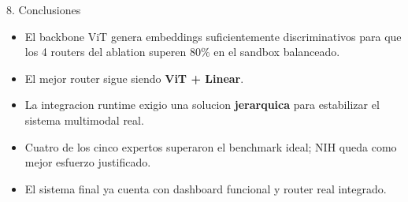 \documentclass[aspectratio=169,11pt]{beamer}
\begin{document}
\begin{frame}{8. Conclusiones}
\begin{itemize}
  \item El backbone ViT genera embeddings suficientemente discriminativos para que los 4 routers del ablation superen 80\% en el sandbox balanceado.
  \item El mejor router sigue siendo \textbf{ViT + Linear}.
  \item La integracion runtime exigio una solucion \textbf{jerarquica} para estabilizar el sistema multimodal real.
  \item Cuatro de los cinco expertos superaron el benchmark ideal; NIH queda como mejor esfuerzo justificado.
  \item El sistema final ya cuenta con dashboard funcional y router real integrado.
\end{itemize}
\end{frame}
\end{document}
